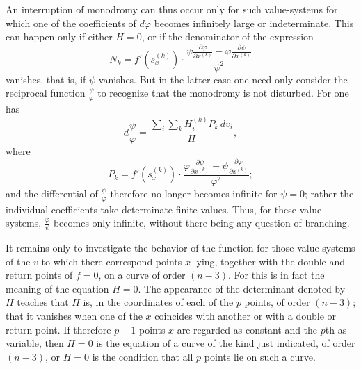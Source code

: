 \documentclass[10pt]{article}
\begin{document}
An interruption of monodromy can thus occur only for such value-systems for which one of the coefficients of \(d\varphi\) becomes infinitely large or indeterminate. This can happen only if either \(H=0\), or if the denominator of the expression
\[
N_k=f'(s_x^{(k)})\cdot\frac{\psi\frac{\partial\varphi}{\partial x^{(k)}}-\varphi\frac{\partial\psi}{\partial x^{(k)}}}{\psi^2}
\]
vanishes, that is, if \(\psi\) vanishes. But in the latter case one need only consider the reciprocal function \(\frac{\psi}{\varphi}\) to recognize that the monodromy is not disturbed. For one has
\[
d\frac{\psi}{\varphi}=\frac{\sum_i\sum_k H_i^{(k)}P_k\,dv_i}{H},
\]
where
\[
P_k=f'(s_x^{(k)})\cdot\frac{\varphi\frac{\partial\psi}{\partial x^{(k)}}-\psi\frac{\partial\varphi}{\partial x^{(k)}}}{\varphi^2};
\]
and the differential of \(\frac{\psi}{\varphi}\) therefore no longer becomes infinite for \(\psi=0\); rather the individual coefficients take determinate finite values. Thus, for these value-systems, \(\frac{\varphi}{\psi}\) becomes only infinite, without there being any question of branching.

It remains only to investigate the behavior of the function for those value-systems of the \(v\) to which there correspond points \(x\) lying, together with the double and return points of \(f=0\), on a curve of order \((n-3)\). For this is in fact the meaning of the equation \(H=0\). The appearance of the determinant denoted by \(H\) teaches that \(H\) is, in the coordinates of each of the \(p\) points, of order \((n-3)\); that it vanishes when one of the \(x\) coincides with another or with a double or return point. If therefore \(p-1\) points \(x\) are regarded as constant and the \(p\)th as variable, then \(H=0\) is the equation of a curve of the kind just indicated, of order \((n-3)\), or \(H=0\) is the condition that all \(p\) points lie on such a curve.
\end{document}
